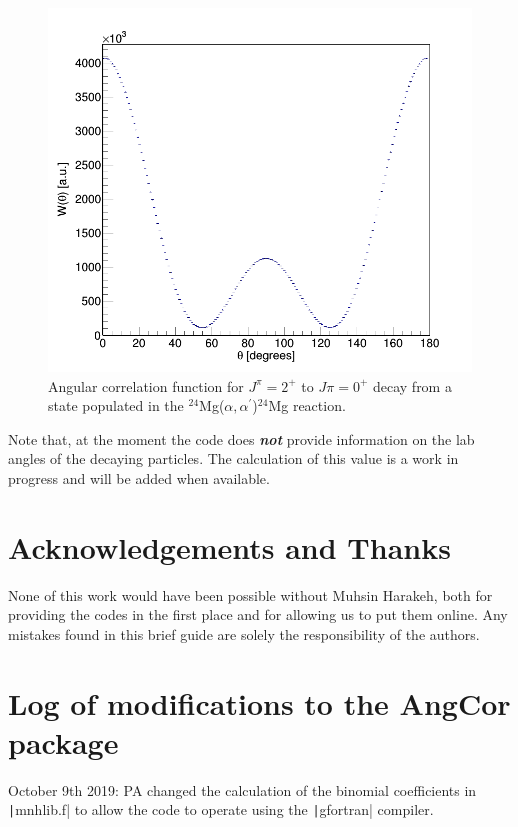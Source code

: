 \documentclass[a4paper,10pt]{article}
\begin{document}
\begin{figure}
 \includegraphics[width=\textwidth]{QuadrupoleAlphaDecayExample.png}
  \caption{Angular correlation function for $J^\pi = 2^+$ to $J\pi = 0^+$ decay from a state populated in the $^{24}$Mg($\alpha,\alpha^\prime$)$^{24}$Mg reaction.}
  \label{fig:2plusTo0PlusAlphaEmission}
\end{figure}


Note that, at the moment the code does {\it \bf not} provide information on the lab angles of the decaying particles. The calculation of this value is a work in progress and will be added when available.

\section{Acknowledgements and Thanks}

None of this work would have been possible without Muhsin Harakeh, both for providing the codes in the first place and for allowing us to put them online. Any mistakes found in this brief guide are solely the responsibility of the authors.

\section{Log of modifications to the AngCor package}

October 9th 2019: PA changed the calculation of the binomial coefficients in \texttt|mnhlib.f| to allow the code to operate using the \texttt|gfortran| compiler.


\end{document}
